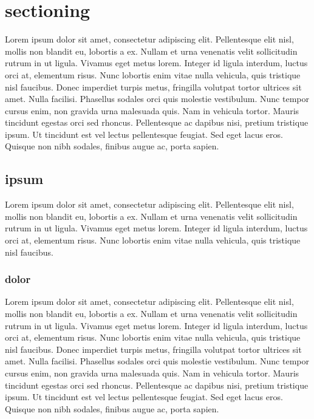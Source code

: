 \documentclass[onecolumn, draftnofoot, 10pt, compsoc]{IEEEtran}
\begin{document}
\tableofcontents


\section{sectioning}
Lorem ipsum dolor sit amet, consectetur adipiscing elit. Pellentesque elit nisl, mollis non blandit eu, lobortis a ex. Nullam et urna venenatis velit sollicitudin rutrum in ut ligula. Vivamus eget metus lorem. Integer id ligula interdum, luctus orci at, elementum risus. Nunc lobortis enim vitae nulla vehicula, quis tristique nisl faucibus. Donec imperdiet turpis metus, fringilla volutpat tortor ultrices sit amet. Nulla facilisi. Phasellus sodales orci quis molestie vestibulum. Nunc tempor cursus enim, non gravida urna malesuada quis. Nam in vehicula tortor. Mauris tincidunt egestas orci sed rhoncus. Pellentesque ac dapibus nisi, pretium tristique ipsum. Ut tincidunt est vel lectus pellentesque feugiat. Sed eget lacus eros. Quisque non nibh sodales, finibus augue ac, porta sapien.
\subsection{ipsum}
Lorem ipsum dolor sit amet, consectetur adipiscing elit. Pellentesque elit nisl, mollis non blandit eu, lobortis a ex. Nullam et urna venenatis velit sollicitudin rutrum in ut ligula. Vivamus eget metus lorem. Integer id ligula interdum, luctus orci at, elementum risus. Nunc lobortis enim vitae nulla vehicula, quis tristique nisl faucibus.
\subsubsection{dolor}
Lorem ipsum dolor sit amet, consectetur adipiscing elit. Pellentesque elit nisl, mollis non blandit eu, lobortis a ex. Nullam et urna venenatis velit sollicitudin rutrum in ut ligula. Vivamus eget metus lorem. Integer id ligula interdum, luctus orci at, elementum risus. Nunc lobortis enim vitae nulla vehicula, quis tristique nisl faucibus. Donec imperdiet turpis metus, fringilla volutpat tortor ultrices sit amet. Nulla facilisi. Phasellus sodales orci quis molestie vestibulum. Nunc tempor cursus enim, non gravida urna malesuada quis. Nam in vehicula tortor. Mauris tincidunt egestas orci sed rhoncus. Pellentesque ac dapibus nisi, pretium tristique ipsum. Ut tincidunt est vel lectus pellentesque feugiat. Sed eget lacus eros. Quisque non nibh sodales, finibus augue ac, porta sapien.


\newpage
\end{document}
